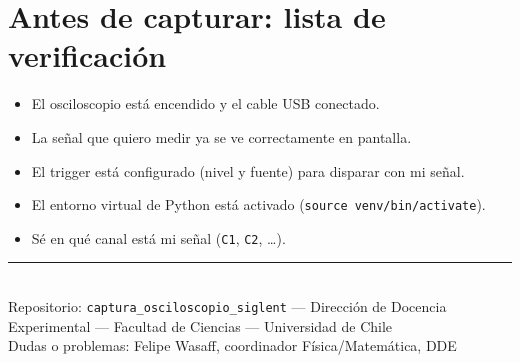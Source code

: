 \documentclass[11pt,a4paper]{article}
\begin{document}
\section{Antes de capturar: lista de verificación}
\begin{itemize}[label={$\square$}, itemsep=0pt, topsep=2pt]
  \item El osciloscopio está encendido y el cable USB conectado.
  \item La señal que quiero medir ya se ve correctamente en pantalla.
  \item El trigger está configurado (nivel y fuente) para disparar con mi
        señal.
  \item El entorno virtual de Python está activado
        (\texttt{source venv/bin/activate}).
  \item Sé en qué canal está mi señal (\texttt{C1}, \texttt{C2}, \ldots).
\end{itemize}

\vfill
\begin{center}
  {\footnotesize\color{gsuave}\rule{0.3\textwidth}{0.4pt}}\\[4pt]
  {\scriptsize\color{gmedio}Repositorio: \texttt{captura\_osciloscopio\_siglent}
  --- Dirección de Docencia Experimental --- Facultad de Ciencias --- Universidad de Chile}\\[2pt]
  {\scriptsize\color{gmedio}Dudas o problemas: Felipe Wasaff, coordinador Física/Matemática, DDE}
\end{center}
\end{document}
